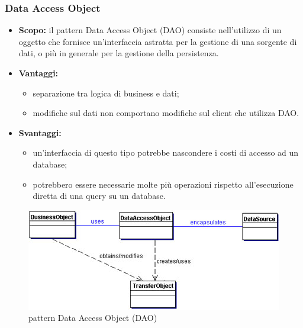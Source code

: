    \subsubsection{Data Access Object}
      \begin{itemize}
       \item \textbf{Scopo:} il pattern Data Access Object (DAO) consiste nell'utilizzo di un oggetto che fornisce un'interfaccia astratta per la gestione di una sorgente di dati, o più in generale per la gestione della persistenza.
	\item \textbf{Vantaggi:}
	  \begin{itemize}
	   \item separazione tra logica di business e dati;
	   \item modifiche sul dati non comportano modifiche sul client che utilizza DAO.
	  \end{itemize}
	\item \textbf{Svantaggi:}
	  \begin{itemize}
	   \item un'interfaccia di questo tipo potrebbe nascondere i costi di accesso ad un database;
	   \item potrebbero essere necessarie molte più operazioni rispetto all'esecuzione diretta di una query su un database.
	  \end{itemize}
	\end{itemize}
	\begin{figure}[h]
		\centering
		\includegraphics[width=\textwidth,height=\textheight,keepaspectratio,scale=0.1]{images/DAOpattern.jpg}
		\caption{pattern Data Access Object (DAO)}\label{fig:dao1}
	\end{figure}
		\newpage
